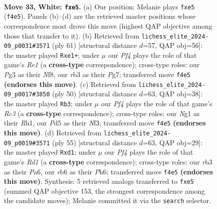 \documentclass[11pt]{article}
\begin{document}
\clearpage

\begin{figure}[p]\centering
\begin{subfigure}{0.46\textwidth}\centering
\resizebox{\linewidth}{!}{%
\newchessgame
\chessboard[
  setfen={2b4k/3n1p1p/1r4p1/3Pp3/1p2PP2/1r4P1/5K1P/R5NR w - - 1 33},
  showmover=false,
  pgfstyle=straightmove, color=movearrow, markmove={f4-e5}
]}
\caption{}
\end{subfigure}\hfill
\begin{subfigure}{0.46\textwidth}\centering
\resizebox{\linewidth}{!}{%
\newchessgame
\chessboard[
  setfen={4rnk1/rp4pp/2p2p2/3P4/1P5P/2P2N2/2R2PP1/4R1K1 b - - 0 31},
  showmover=false,
  pgfstyle=straightmove, color=movearrow, markmove={e8-e1}
]}
\caption{}
\end{subfigure}
\\[4pt]
\begin{subfigure}{0.46\textwidth}\centering
\resizebox{\linewidth}{!}{%
\newchessgame
\chessboard[
  setfen={2r5/1k2bp1p/p4p1B/3rpP2/1n6/2R2NP1/PP5P/1K5R w - - 4 26},
  showmover=false,
  pgfstyle=straightmove, color=movearrow, markmove={c3-b3}
]}
\caption{}
\end{subfigure}\hfill
\begin{subfigure}{0.46\textwidth}\centering
\resizebox{\linewidth}{!}{%
\newchessgame
\chessboard[
  setfen={1r1r4/1p2kpp1/p3pn1p/4N3/6PP/1PP2P2/1P3K2/3RR3 b - - 0 28},
  showmover=false,
  pgfstyle=straightmove, color=movearrow, markmove={d8-d1}
]}
\caption{}
\end{subfigure}
\caption{\textbf{Move 33, White: \texttt{fxe5}.} (a) Our position; Melanie plays \texttt{fxe5} (\texttt{f4e5}). Panels (b)--(d) are the retrieved master positions whose correspondence most drove this move (highest QAP objective among those that transfer to it). (b) Retrieved from \texttt{lichess\_elite\_2024-09\_p0031\#3571} (ply 61) [structural distance $d$=57, QAP obj=56]: the master played \texttt{Rxe1+}; under $\mu$ our \emph{Pf4} plays the role of that game's \emph{Re1} (a \textbf{cross-type} correspondence); cross-type roles: our \emph{P}g3 as their \emph{N}f8, our \emph{r}b3 as their \emph{P}g7; transferred move \texttt{f4e5} \textbf{(endorses this move)}. (c) Retrieved from \texttt{lichess\_elite\_2024-09\_p0017\#3850} (ply 50) [structural distance $d$=63, QAP obj=38]: the master played \texttt{Rb3}; under $\mu$ our \emph{Pf4} plays the role of that game's \emph{Rc3} (a \textbf{cross-type} correspondence); cross-type roles: our \emph{N}g1 as their \emph{R}h1, our \emph{P}d5 as their \emph{N}f3; transferred move \texttt{f4e5} \textbf{(endorses this move)}. (d) Retrieved from \texttt{lichess\_elite\_2024-09\_p0019\#3571} (ply 55) [structural distance $d$=63, QAP obj=29]: the master played \texttt{Rxd1}; under $\mu$ our \emph{Pf4} plays the role of that game's \emph{Rd1} (a \textbf{cross-type} correspondence); cross-type roles: our \emph{r}b3 as their \emph{P}a6, our \emph{r}b6 as their \emph{P}h6; transferred move \texttt{f4e5} \textbf{(endorses this move)}. Synthesis: 5 retrieved analogs transferred to \texttt{fxe5} (summed QAP objective 153, the strongest correspondence among the candidate moves); Melanie committed it via the \texttt{search} selector.}

\end{figure}
\end{document}
